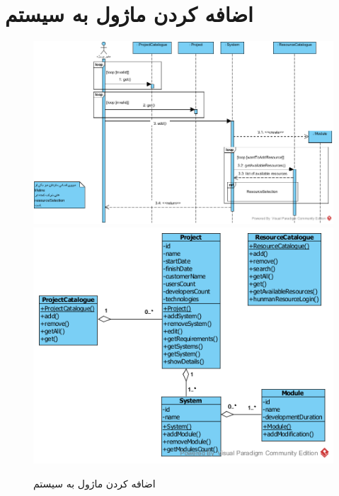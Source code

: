 \section{اضافه کردن ماژول به سیستم}
\begin{figure}[H]
	\centering
	\includegraphics[scale=0.6]{img/sequence-analysis/AddModuleToSystem}
	\includegraphics[scale=0.6]{img/sequence-analysis/AddModuleToSystemC}	
	\caption{اضافه کردن ماژول به سیستم}
\end{figure}

